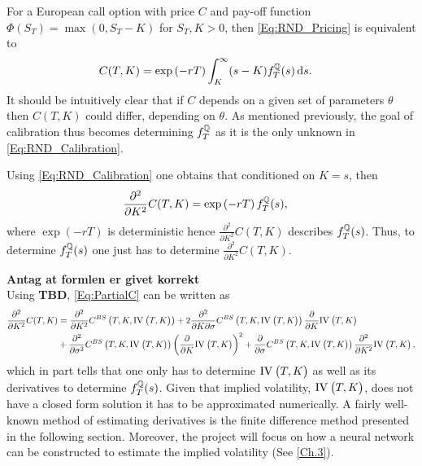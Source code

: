 For a European call option with price $C$ and pay-off function $\Phi(S_T)=\max(0, S_T-K)$ for $S_T, K>0$, then \eqref{Eq:RND_Pricing} is equivalent to
\begin{align}\label{Eq:RND_Calibration}
    C(T,K) &= \exp\left(-rT\right)\int_K^\infty (s-K)f_T^{\mathbb{Q}}(s)\,\mathrm{d}s.
\end{align}
It should be intuitively clear that if $C$ depends on a given set of parameters $\theta$ then $C(T,K)$ could differ, depending on $\theta$. As mentioned previously, the goal of calibration thus becomes determining $f_T^{\mathbb{Q}}$ as it is the only unknown in \eqref{Eq:RND_Calibration}. 

Using \eqref{Eq:RND_Calibration} one obtains that conditioned on $K=s$, then
\begin{align}\label{Eq:PartialC}
    \frac{\partial^2}{\partial K^2}C(T,K) &= \exp\left(-rT\right)f_T^{\mathbb{Q}}(s),
\end{align}
where $\exp\left(-rT\right)$ is deterministic hence $\frac{\partial^2}{\partial K^2}C(T,K)$ describes $f_T^{\mathbb{Q}}(s)$. Thus, to determine $f_T^{\mathbb{Q}}(s)$ one just has to determine $\frac{\partial^2}{\partial K^2}C(T,K)$. 


\textbf{Antag at formlen er givet korrekt}\\
Using \textbf{TBD}, \eqref{Eq:PartialC} can be written as
\begin{align}\label{Eq:RND_Derivatives}
    \frac{\partial^2}{\partial K^2}C(T,K) &= \frac{\partial^2}{\partial K^2}C^{BS}\left(T,K,\IV{T,K}\right)+2\frac{\partial^2}{\partial K\partial\sigma}C^{BS}\left(T,K,\IV{T,K}\right)\frac{\partial}{\partial K}\IV{T,K}\\
    &+\frac{\partial^2}{\partial\sigma^2}C^{BS}\left(T,K,\IV{T,K}\right)\left(\frac{\partial}{\partial K}\IV{T,K}\right)^2+\frac{\partial}{\partial\sigma}C^{BS}\left(T,K,\IV{T,K}\right)\frac{\partial^2}{\partial K^2}\IV{T,K},
\end{align}
which in part tells that one only has to determine $\IV{T,K}$ as well as its derivatives to determine $f_T^{\mathbb{Q}}(s)$. Given that implied volatility, $\IV{T,K}$, does not have a closed form solution it has to be approximated numerically. A fairly well-known method of estimating derivatives is the finite difference method presented in the following section. Moreover, the project will focus on how a neural network can be constructed to estimate the implied volatility (See \autoref{Ch.3}).


